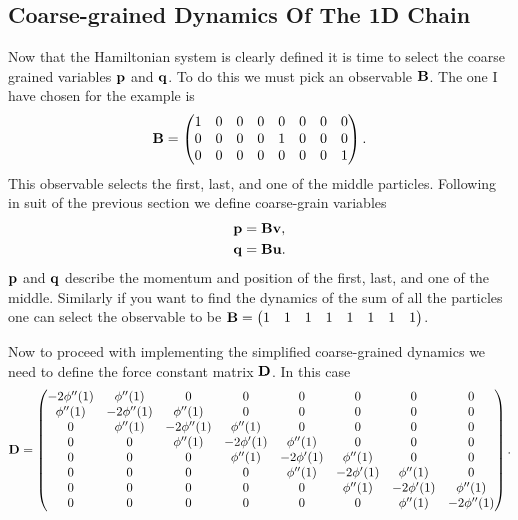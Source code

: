\subsection{Coarse-grained Dynamics Of The 1D Chain}
Now that the Hamiltonian system is clearly defined it is time to select the coarse grained variables $\mathbf{p}$ and $\mathbf{q}$. To do this we must pick an observable $\mathbf{B}$. The one I have chosen for the example is  
\begin{align*}
\mathbf{B}=
\begin{pmatrix}
1 & 0 &0  &0  &0  &0  &0  & 0\\ 
 0& 0 &0  &0  &1  &0  &0  &0 \\ 
 0&  0&0  & 0 &0  &0  & 0 & 1
\end{pmatrix}.
\end{align*}
This observable selects the first, last, and one of the middle particles. Following in suit of the previous section we define coarse-grain variables 
\begin{align*}
\mathbf{p} &= \mathbf{B}\mathbf{v},\\
\mathbf{q} &=\mathbf{B}\mathbf{u}.
\end{align*}
$\mathbf{p}$ and $\mathbf{q}$ describe the momentum and position of the first, last, and one of the middle. Similarly if you want to find the dynamics of the sum of all the particles one can select the observable to be $\mathbf{B}=\begin{pmatrix}
1 & 1 & 1 & 1 & 1 & 1 & 1 & 1
\end{pmatrix}$.

Now to proceed with implementing the simplified coarse-grained dynamics we need to define the force constant matrix $\mathbf{D}$. In this case 
\begin{align*}
\mathbf{D} = \begin{pmatrix}
 -2\phi''(1)& \phi''(1)  &0  & 0 &0  &0  &0  &0 \\ 
 \phi''(1)& -2\phi''(1)  & \phi''(1) & 0 &0  &0  &0 &0\\ 
0 & \phi''(1) & -2\phi''(1) &\phi''(1)  &0  &0  &0  &0 \\ 
 0&0  & \phi''(1) &  -2\phi'(1)&\phi''(1)  & 0 & 0 &0 \\ 
 0&0  &0  &\phi''(1) &  -2\phi'(1)&\phi''(1)&0  &0 \\ 
 0& 0 & 0 & 0 & \phi''(1) &  -2\phi'(1)&\phi''(1) & 0\\ 
 0& 0 & 0 &  0& 0 & \phi''(1) &  -2\phi'(1)&\phi''(1) \\ 
 0& 0 & 0 & 0 & 0 & 0&\phi''(1) & -2\phi''(1)  
\end{pmatrix}.
\end{align*}